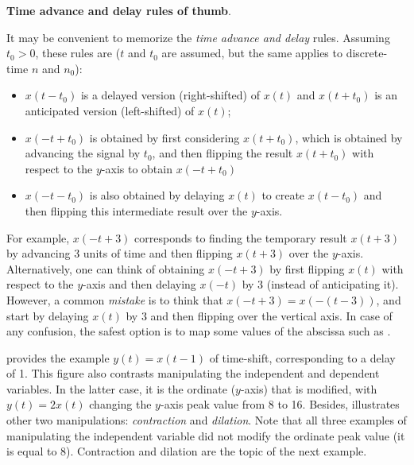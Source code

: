 \bExample \textbf{Time advance and delay rules of thumb}.

It may be convenient to memorize the \emph{time advance and delay} rules. Assuming $t_0 > 0$, these rules are ($t$ and $t_0$ are assumed, but the same applies to discrete-time $n$ and $n_0$):
\begin{itemize}
	\item $x(t-t_0)$ is a delayed version (right-shifted) of $x(t)$ and $x(t+t_0)$ is an anticipated version (left-shifted) of $x(t)$;
	\item $x(-t+t_0)$ is obtained by first considering $x(t+t_0)$, which is obtained by advancing the signal by $t_0$, and then 
	flipping the result $x(t+t_0)$ with respect to the $y$-axis to obtain $x(-t+t_0)$
	\item $x(-t-t_0)$ is also obtained by delaying $x(t)$ to create $x(t-t_0)$ and then flipping this intermediate result over the $y$-axis.	
	\end{itemize}	
For example, $x(-t+3)$ corresponds to finding the temporary result $x(t+3)$ by advancing 3 units of time and then
flipping $x(t+3)$ over the $y$-axis. Alternatively, one can think of obtaining $x(-t+3)$ by first flipping $x(t)$ with respect to the $y$-axis and then delaying $x(-t)$ by 3 (instead of anticipating it). However, a common \emph{mistake} is to think that $x(-t+3) = x(-(t-3))$, and start by delaying $x(t)$ by 3 and then flipping over the vertical axis. In case of any confusion, the safest option is to map some values of the abscissa such as .
\eExample


 provides the example $y(t)=x(t-1)$ of time-shift, corresponding to a delay of 1. This figure also contrasts manipulating the independent and dependent variables. In the latter case, it is the ordinate ($y$-axis) that is modified, with $y(t)=2x(t)$ changing the $y$-axis peak value from 8 to 16.  Besides,  illustrates other two manipulations: \emph{contraction} and \emph{dilation}. Note that all three examples of manipulating the independent variable did not modify the ordinate peak value (it is equal to 8). Contraction and dilation are the topic of the next example.


